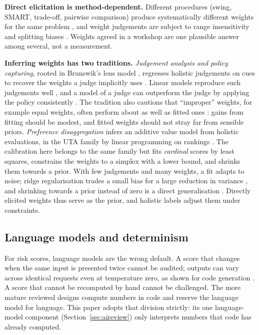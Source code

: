 \documentclass[10pt,twocolumn,a4paper]{article}
\begin{document}
\textbf{Direct elicitation is method-dependent.} Different procedures (swing, SMART,
trade-off, pairwise comparison) produce systematically different weights for the same
problem \cite{borcherding1991,poyhonen2001}, and weight judgements are subject to range
insensitivity and splitting biases \cite{weber1993}. Weights agreed in a workshop are one
plausible answer among several, not a measurement.

\textbf{Inferring weights has two traditions.} \emph{Judgement analysis and policy
capturing}, rooted in Brunswik's lens model \cite{hammond1955}, regresses holistic
judgements on cues to recover the weights a judge implicitly uses
\cite{aimansmith2002,karren2002}. Linear models reproduce such judgements well
\cite{karelaia2008}, and a model of a judge can outperform the judge by applying the
policy consistently \cite{goldberg1970}. The tradition also cautions that ``improper''
weights, for example equal weights, often perform about as well as fitted ones
\cite{dawes1979}: gains from fitting should be modest, and fitted weights should not
stray far from sensible priors. \emph{Preference disaggregation} infers an additive value
model from holistic evaluations, in the UTA family by linear programming on rankings
\cite{uta1982,uta2001}. The calibration here belongs to the same family but fits
\emph{cardinal} scores by least squares, constrains the weights to a simplex with a lower
bound, and shrinks them towards a prior. With few judgements and many weights, a fit
adapts to noise; ridge regularisation trades a small bias for a large reduction in
variance \cite{hoerl1970}, and shrinking towards a prior instead of zero is a direct
generalisation \cite{hastie2009}. Directly elicited weights thus serve as the prior, and
holistic labels adjust them under constraints.

\subsection{Language models and determinism}
For risk scores, language models are the wrong default. A score that changes when the
same input is presented twice cannot be audited; outputs can vary across identical
requests even at temperature zero, as shown for code generation \cite{ouyang2025}. A
score that cannot be recomputed by hand cannot be challenged. The more mature reviewed
designs compute numbers in code and reserve the language model for language. This paper
adopts that division strictly: its one language-model component
(Section~\ref{sec:aireview}) only interprets numbers that code has already computed.
\end{document}
